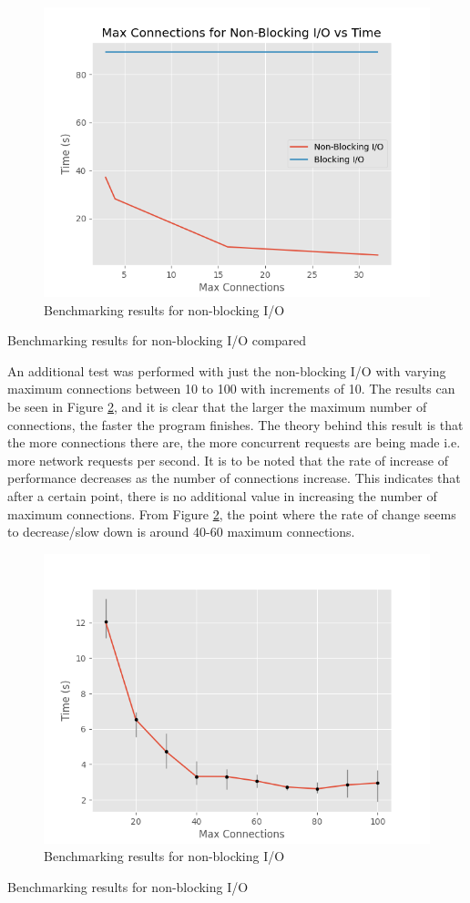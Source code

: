 \documentclass[12pt]{article}
\begin{document}
\begin{figure}[!h]
    \centering
    \includegraphics[width=0.6\linewidth]{../plot/num_connections/graph3.png}
    \caption{Benchmarking results for non-blocking I/O}
    \label{fig:benchmarking-nonblocking1}
\end{figure}

\begin{table}
    \centering
    \caption{Benchmarking results for non-blocking I/O compared}
    \label{table:benchmarking-nonblocking1}
\end{table}








An additional test was performed with just the non-blocking I/O with varying maximum connections between 10 to 100 with increments of 10. The results can be seen in Figure \ref*{fig:benchmarking-nonblocking}, and it is clear that the larger the maximum number of connections, the faster the program finishes. The theory behind this result is that the more connections there are, the more concurrent requests are being made i.e. more network requests per second. It is to be noted that the rate of increase of performance decreases as the number of connections increase. This indicates that after a certain point, there is no additional value in increasing the number of maximum connections. From Figure \ref*{fig:benchmarking-nonblocking}, the point where the rate of change seems to decrease/slow down is around 40-60 maximum connections. 

\begin{figure}[!h]
    \centering
    \includegraphics[width=0.6\linewidth]{../plot/num_connections/graph.png}
    \caption{Benchmarking results for non-blocking I/O}
    \label{fig:benchmarking-nonblocking}
\end{figure}

\begin{table}
    \centering
    \caption{Benchmarking results for non-blocking I/O}
    \label{table:benchmarking-nonblocking}
\end{table}
\end{document}
